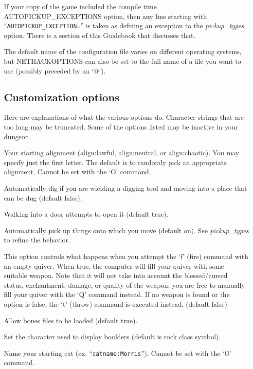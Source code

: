 If your copy of the game included the compile time AUTOPICKUP\_EXCEPTIONS
option, then any line starting with ``{\tt AUTOPICKUP\_EXCEPTION=}'' is taken
as defining an exception to the 
{\it pickup\_types }
option. 
There is a section of this Guidebook that discusses that.

The default name of the configuration file varies on different
operating systems, but NETHACKOPTIONS can also be set to
the full name of a file you want to use (possibly preceded by an `@').
\subsection*{Customization options}

Here are explanations of what the various options do.
Character strings that are too long may be truncated.
Some of the options listed may be inactive in your dungeon.
\blist{}
\item[\tb{align}]
Your starting alignment (align:lawful, align:neutral,
or align:chaotic).  You may specify just the first letter.
The default is to randomly pick an appropriate alignment.
Cannot be set with the `O' command.
\item[\tb{autodig}]
Automatically dig if you are wielding a digging tool and moving into a place
that can be dug (default false).
\item[\ib{autoopen}]
Walking into a door attempts to open it (default true).
\item[\tb{``autopickup  ''}]
Automatically pick up things onto which you move (default on). 
See
{\it pickup\_types }
to refine the behavior.
\item[\tb{``autoquiver  ''}]
This option controls what happens when you attempt the `f' (fire)
command with an empty quiver.  When true, the computer will fill
your quiver with some suitable weapon.  Note that it will not take
into account the blessed/cursed status, enchantment, damage, or
quality of the weapon; you are free to manually fill your quiver with
the `Q' command instead.  If no weapon is found or the option is
false, the `t' (throw) command is executed instead.  (default false)
\item[\tb{bones   }]
Allow bones files to be loaded (default true).
\item[\tb{boulder}]
Set the character used to display boulders (default is rock class symbol).
\item[\tb{catname}]
Name your starting cat (ex. ``{\tt catname:Morris}'').
Cannot be set with the `O' command.

